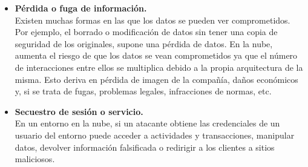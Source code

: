 \begin{itemize}
	\item \textbf {Pérdida o fuga de información. } \\ Existen muchas formas en las que los datos se pueden ver comprometidos. Por ejemplo, el borrado o modificación de datos sin tener una copia de seguridad de los originales, supone una pérdida de datos. 
En la nube, aumenta el riesgo de que los datos se vean comprometidos ya que el número de interacciones entre ellos se multiplica debido a la propia arquitectura de la misma. Esto deriva en pérdida de imagen de la compañía, daños económicos y, si se trata de fugas, problemas legales, infracciones de normas, etc.
	\item \textbf {Secuestro de sesión o servicio. } \\  En un entorno en la nube, si un atacante obtiene las credenciales de un usuario del entorno puede acceder a actividades y transacciones, manipular datos, devolver información falsificada o redirigir a los clientes a sitios maliciosos.
\end{itemize} 



